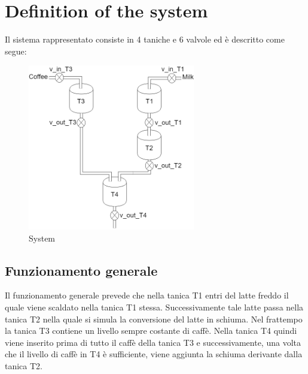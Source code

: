 \documentclass[12pt]{article}
\begin{document}
\section{Definition of the system}
Il sistema rappresentato consiste in 4 taniche e 6 valvole ed è descritto come segue:
\begin{figure}[H]
\begin{center}
\includegraphics[width=0.65\textwidth]{images/system.png} %
\caption{System}
\end{center}
\end{figure}

\subsection{Funzionamento generale}
Il funzionamento generale prevede che nella tanica T1 entri del latte freddo il quale viene scaldato nella tanica T1 stessa. Successivamente tale latte passa nella tanica T2 nella quale si simula la conversione del latte in schiuma. Nel frattempo la tanica T3 contiene un livello sempre costante di caffè. Nella tanica T4 quindi viene inserito prima di tutto il caffè della tanica T3 e successivamente, una volta che il livello di caffè in T4 è sufficiente, viene aggiunta la schiuma derivante dalla tanica T2.
\end{document}
